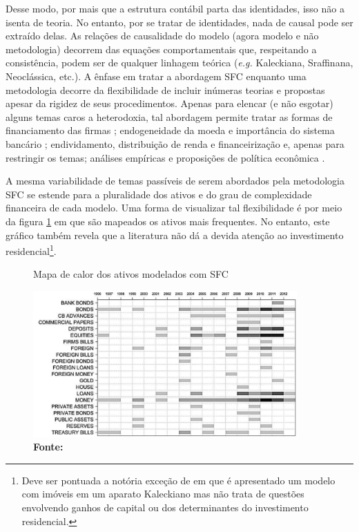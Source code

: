 Desse modo, por mais que a estrutura contábil parta das identidades, isso não a isenta de teoria. No entanto, por se tratar de identidades, nada de causal pode ser extraído delas. As relações de causalidade do modelo (agora modelo e não metodologia) decorrem das equações comportamentais que, respeitando a consistência, podem ser de qualquer linhagem teórica (\textit{e.g.} Kaleckiana, Sraffinana, Neoclássica, etc.). A ênfase em tratar a abordagem SFC enquanto uma metodologia decorre da flexibilidade de incluir inúmeras teorias e propostas apesar da rigidez de seus procedimentos. Apenas para elencar (e não esgotar) alguns temas caros a heterodoxia, tal abordagem permite tratar as formas de financiamento das firmas \cites{asimakopulos_kalecki_1983}{skott_finance_1988}{messori_financing_1991}; endogeneidade da moeda e importância do sistema bancário \cites{messori_financing_1991}{dow_horizontalism:_1996}{arestis_theoretical_1996}{godley_money_1999}{lavoie_note_1999}{lima_macrodynamics_2007}; endividamento, distribuição de renda e financeirização \cites{palley_inside_1996}{wolfson_irving_1996}{palley_money_1997}{palley_financial_2002}{dos_santos_revisiting_2009}{palley_inside_2010}{hein_finance-dominated_2012} e, apenas para restringir os temas; análises empíricas e proposições de política econômica \cites{godley_seven_1999}{godley_fiscal_2007}{godley_simple_2007}{arestis_income_2011}{zezza_design_2019}. 

A mesma variabilidade de temas passíveis de serem abordados pela metodologia SFC se estende para a pluralidade dos ativos e do grau de complexidade financeira de cada modelo. Uma forma de visualizar tal flexibilidade é por meio da figura \ref{Heatmap} em que são mapeados os ativos mais frequentes. No entanto, este gráfico também revela que a literatura não dá a devida atenção ao investimento residencial\footnote{Deve ser pontuada a notória exceção de \textcite{zezza_u.s._2008} em que é apresentado um modelo com imóveis em um aparato Kaleckiano mas não trata de questões envolvendo ganhos de capital ou dos determinantes do investimento residencial.}. 
\begin{figure}
    \centering
    \caption{Mapa de calor dos ativos modelados com SFC}
    \label{Heatmap}
    \includegraphics[width = 0.9\textwidth]{Modelo/Caverzassi_Heatmap.png}
    \caption*{\textbf{Fonte:} \textcite[p.~4]{caverzasi_stock-flow_2013}}
\end{figure}



